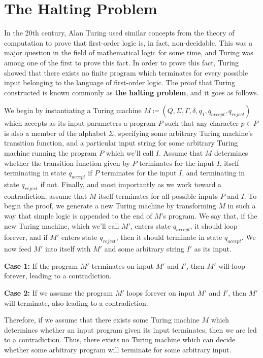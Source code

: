 \documentclass{article}
\begin{document}
\section{The Halting Problem}
In the 20th century, Alan Turing used similar concepts from the theory of computation to prove that first-order logic is, in fact, non-decidable.  This was a major question in the field of mathematical logic for some time, and Turing was among one of the first to prove this fact.  In order to prove this fact, Turing showed that there exists no finite program which terminates for every possible input belonging to the language of first-order logic.  The proof that Turing constructed is known commonly as \textbf{the halting problem}, and it goes as follows. \cite{7}
\begin{prf}
	We begin by instantiating a Turing machine $M \coloneq (Q, \Sigma, \Gamma, \delta, q_{1}, q_{accept}, q_{reject})$ which accepts as its input parameters a program $P$ such that any character $p \in P$ is also a member of the alphabet $\Sigma$, specifying some arbitrary Turing machine's transition function, and a particular input string for some arbitrary Turing machine running the program $P$ which we'll call $I$.  Assume that $M$ determines whether the transition function given by $P$ terminates for the input $I$, itself terminating in state $q_{accept}$ if $P$ terminates for the input $I$, and terminating in state $q_{reject}$ if not.  Finally, and most importantly as we work toward a contradiction, assume that $M$ itself terminates for all possible inputs $P$ and $I$.  To begin the proof, we generate a new Turing machine by transforming $M$ in such a way that simple logic is appended to the end of $M$'s program.  We say that, if the new Turing machine, which we'll call $M'$, enters state $q_{accept}$, it should loop forever, and if $M'$ enters state $q_{reject}$, then it should terminate in state $q_{accept}$.  We now feed $M'$ into itself with $M'$ and some arbitrary string $I'$ as its input.\\
\begin{adjustwidth}{0.5cm}{}
	\textbf{Case 1:} If the program $M'$ terminates on input $M'$ and $I'$, then $M'$ will loop forever, leading to a contradiction.\\
\end{adjustwidth}
\begin{adjustwidth}{0.5cm}{}
	\textbf{Case 2:} If we assume the program $M'$ loops forever on input $M'$ and $I'$, then $M'$ will terminate, also leading to a contradiction.\\
\end{adjustwidth}
	\noindent Therefore, if we assume that there exists some Turing machine $M$ which determines whether an input program given its input terminates, then we are led to a contradiction.  Thus, there exists no Turing machine which can decide whether some arbitrary program will terminate for some arbitrary input. \cite{5} \qedsymbol
\end{prf}
\end{document}

